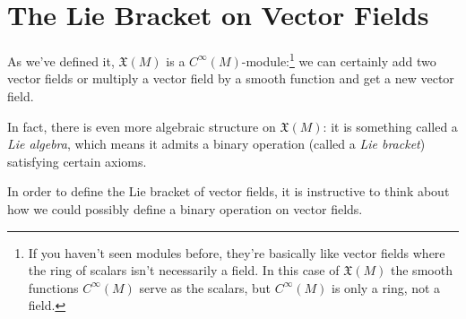 
\section{The Lie Bracket on Vector Fields}

As we've defined it, $\mathfrak{X}(M)$ is a $C^\infty(M)$-module:\footnote{If you haven't seen modules before, they're basically like vector fields where the ring of scalars isn't necessarily a field. In this case of $\mathfrak{X}(M)$ the smooth functions $C^\infty(M)$ serve as the scalars, but $C^\infty(M)$ is only a ring, not a field.}  we can certainly add two vector fields or multiply a vector field by a smooth function and get a new vector field.

In fact, there is even more algebraic structure on $\mathfrak{X}(M)$: it is something called a \emph{Lie algebra}, which means it admits a binary operation (called a \emph{Lie bracket}) satisfying certain axioms.

In order to define the Lie bracket of vector fields, it is instructive to think about how we could possibly define a binary operation on vector fields. 

